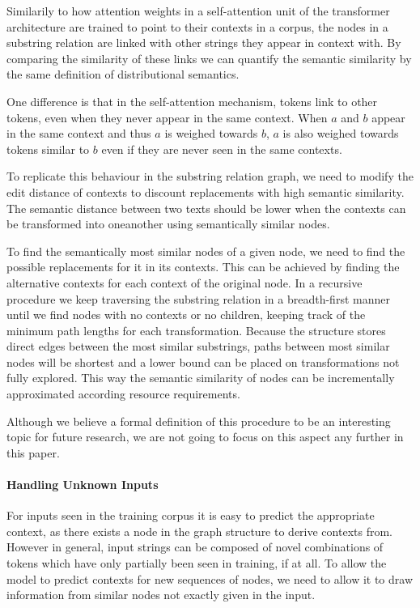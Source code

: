 Similarily to how attention weights in a self-attention unit of the transformer architecture are trained to point to their contexts in a corpus, the nodes in a substring relation are linked with other strings they appear in context with. By comparing the similarity of these links we can quantify the semantic similarity by the same definition of distributional semantics.

One difference is that in the self-attention mechanism, tokens link to other tokens, even when they never appear in the same context. When $a$ and $b$ appear in the same context and thus $a$ is weighed towards $b$, $a$ is also weighed towards tokens similar to $b$ even if they are never seen in the same contexts.

To replicate this behaviour in the substring relation graph, we need to modify the edit distance of contexts to discount replacements with high semantic similarity. The semantic distance between two texts should be lower when the contexts can be transformed into oneanother using semantically similar nodes.

To find the semantically most similar nodes of a given node, we need to find the possible replacements for it in its contexts. This can be achieved by finding the alternative contexts for each context of the original node. In a recursive procedure we keep traversing the substring relation in a breadth-first manner until we find nodes with no contexts or no children, keeping track of the minimum path lengths for each transformation. Because the structure stores direct edges between the most similar substrings, paths between most similar nodes will be shortest and a lower bound can be placed on transformations not fully explored. This way the semantic similarity of nodes can be incrementally approximated according resource requirements.

Although we believe a formal definition of this procedure to be an interesting topic for future research, we are not going to focus on this aspect any further in this paper.

\paragraph{Handling Unknown Inputs}
For inputs seen in the training corpus it is easy to predict the appropriate context, as there exists a node in the graph structure to derive contexts from. However in general, input strings can be composed of novel combinations of tokens which have only partially been seen in training, if at all. To allow the model to predict contexts for new sequences of nodes, we need to allow it to draw information from similar nodes not exactly given in the input.

